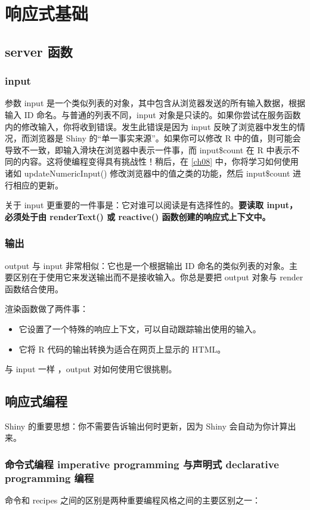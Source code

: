 \chapter{响应式基础\label{ch03}}
\section{server 函数}
\subsection{input}
参数 input 是一个类似列表的对象，其中包含从浏览器发送的所有输入数据，根据输入 ID 命名。与普通的列表不同，input 对象是只读的。如果你尝试在服务函数内的修改输入，你将收到错误。发生此错误是因为 input 反映了浏览器中发生的情况，而浏览器是 Shiny 的“单一事实来源”。如果你可以修改 R 中的值，则可能会导致不一致，即输入滑块在浏览器中表示一件事，而 input\$count 在 R 中表示不同的内容。这将使编程变得具有挑战性！稍后，在 \autoref{ch08} 中，你将学习如何使用诸如 updateNumericInput() 修改浏览器中的值之类的功能，然后 input\$count 进行相应的更新。

关于 input 更重要的一件事是：它对谁可以阅读是有选择性的。\textbf{要读取 input，必须处于由 renderText() 或 reactive() 函数创建的响应式上下文中。}
\subsection{输出}
output 与 input 非常相似：它也是一个根据输出 ID 命名的类似列表的对象。主要区别在于使用它来发送输出而不是接收输入。你总是要把 output 对象与 render 函数结合使用。

渲染函数做了两件事：
\begin{itemize}
    \item 它设置了一个特殊的响应上下文，可以自动跟踪输出使用的输入。

    \item 它将 R 代码的输出转换为适合在网页上显示的 HTML。
\end{itemize}
与 input 一样 ，output 对如何使用它很挑剔。
\section{响应式编程}
Shiny 的重要思想：你不需要告诉输出何时更新，因为 Shiny 会自动为你计算出来。
\subsection{命令式编程 imperative programming 与声明式 declarative programming 编程}
命令和  recipes 之间的区别是两种重要编程风格之间的主要区别之一：


